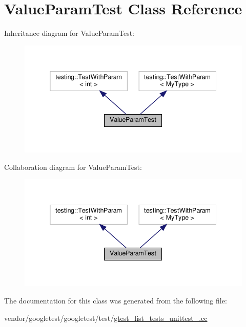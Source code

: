 \hypertarget{class_value_param_test}{}\section{Value\+Param\+Test Class Reference}
\label{class_value_param_test}


Inheritance diagram for Value\+Param\+Test\+:
\nopagebreak
\begin{figure}[H]
\begin{center}
\leavevmode
\includegraphics[width=338pt]{class_value_param_test__inherit__graph}
\end{center}
\end{figure}


Collaboration diagram for Value\+Param\+Test\+:
\nopagebreak
\begin{figure}[H]
\begin{center}
\leavevmode
\includegraphics[width=338pt]{class_value_param_test__coll__graph}
\end{center}
\end{figure}


The documentation for this class was generated from the following file\+:\begin{DoxyCompactItemize}
\item 
vendor/googletest/googletest/test/\hyperlink{gtest__list__tests__unittest___8cc}{gtest\+\_\+list\+\_\+tests\+\_\+unittest\+\_\+.\+cc}\end{DoxyCompactItemize}
